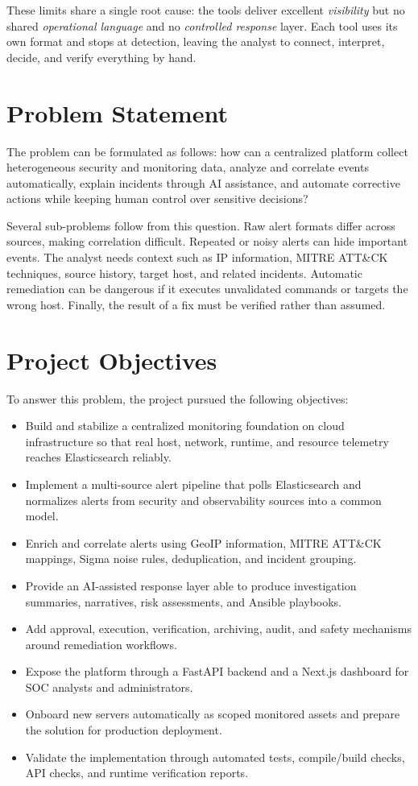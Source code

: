 These limits share a single root cause: the tools deliver excellent \emph{visibility} but no shared \emph{operational language} and no \emph{controlled response} layer. Each tool uses its own format and stops at detection, leaving the analyst to connect, interpret, decide, and verify everything by hand.

\section{Problem Statement}

The problem can be formulated as follows: how can a centralized platform collect heterogeneous security and monitoring data, analyze and correlate events automatically, explain incidents through AI assistance, and automate corrective actions while keeping human control over sensitive decisions?

Several sub-problems follow from this question. Raw alert formats differ across sources, making correlation difficult. Repeated or noisy alerts can hide important events. The analyst needs context such as IP information, MITRE ATT\&CK techniques, source history, target host, and related incidents. Automatic remediation can be dangerous if it executes unvalidated commands or targets the wrong host. Finally, the result of a fix must be verified rather than assumed.

\section{Project Objectives}

To answer this problem, the project pursued the following objectives:

\begin{itemize}[leftmargin=1cm]
\item Build and stabilize a centralized monitoring foundation on cloud infrastructure so that real host, network, runtime, and resource telemetry reaches Elasticsearch reliably.
\item Implement a multi-source alert pipeline that polls Elasticsearch and normalizes alerts from security and observability sources into a common model.
\item Enrich and correlate alerts using GeoIP information, MITRE ATT\&CK mappings, Sigma noise rules, deduplication, and incident grouping.
\item Provide an AI-assisted response layer able to produce investigation summaries, narratives, risk assessments, and Ansible playbooks.
\item Add approval, execution, verification, archiving, audit, and safety mechanisms around remediation workflows.
\item Expose the platform through a FastAPI backend and a Next.js dashboard for SOC analysts and administrators.
\item Onboard new servers automatically as scoped monitored assets and prepare the solution for production deployment.
\item Validate the implementation through automated tests, compile/build checks, API checks, and runtime verification reports.
\end{itemize}

